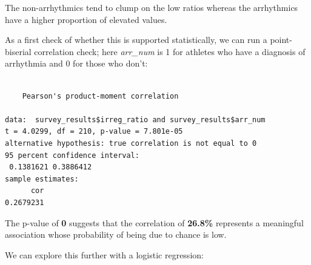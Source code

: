\documentclass[
  letterpaper,
  DIV=11,
  numbers=noendperiod]{scrartcl}
\begin{document}
The non-arrhythmics tend to clump on the low ratios whereas the
arrhythmics have a higher proportion of elevated values.

As a first check of whether this is supported statistically, we can run
a point-biserial correlation check; here \emph{arr\_num} is 1 for
athletes who have a diagnosis of arrhythmia and 0 for those who don't:

\begin{verbatim}

    Pearson's product-moment correlation

data:  survey_results$irreg_ratio and survey_results$arr_num
t = 4.0299, df = 210, p-value = 7.801e-05
alternative hypothesis: true correlation is not equal to 0
95 percent confidence interval:
 0.1381621 0.3886412
sample estimates:
      cor 
0.2679231 
\end{verbatim}

The p-value of \textbf{0} suggests that the correlation of
\textbf{26.8\%} represents a meaningful association whose probability of
being due to chance is low.

We can explore this further with a logistic regression:
\end{document}
